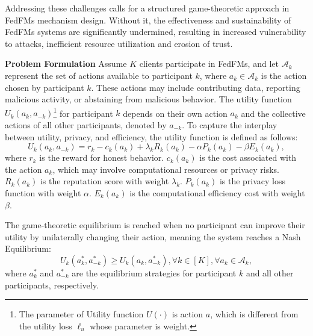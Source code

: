 Addressing these challenges calls for a structured game-theoretic approach in FedFMs mechanism design. Without it, the effectiveness and sustainability of FedFMs systems are significantly undermined, resulting in increased vulnerability to attacks, inefficient resource utilization and erosion of trust. 




\textbf{Problem Formulation} Assume $K$ clients participate in FedFMs, and let $\mathcal{A}_k$ represent the set of actions available to participant $k$, where $a_k \in \mathcal{A}_k$ is the action chosen by participant $k$. These actions may include contributing data, reporting malicious activity, or abstaining from malicious behavior. The utility function $U_k(a_k, a_{-k})$\footnote{The parameter of Utility function $U(\cdot)$ is action $a$, which is different from the utility loss $\ell_u$ whose parameter is weight.} for participant $k$ depends on their own action $a_k$ and the collective actions of all other participants, denoted by $a_{-k}$. To capture the interplay between utility, privacy, and efficiency, the utility function is defined as follows:
\begin{equation}
\label{eq:game_utility}
U_k(a_k, a_{-k}) = r_k - c_k(a_k) + \lambda_k R_k(a_k) - \alpha P_k(a_k) - \beta E_k(a_k),
\end{equation}
where $r_k$ is the reward for honest behavior. $c_k(a_k)$ is the cost associated with the action $a_k$, which may involve computational resources or privacy risks. $R_k(a_k)$ is the reputation score with weight $\lambda_k$. $P_k(a_k)$ is the privacy loss function with weight $\alpha$. $E_k(a_k)$ is the computational efficiency cost with weight $\beta$. 

The game-theoretic equilibrium is reached when no participant can improve their utility by unilaterally changing their action, meaning the system reaches a Nash Equilibrium:
\begin{equation}
\label{eq:game_nash}
U_k(a_k^*, a_{-k}^*) \geq U_k(a_k, a_{-k}^*), \forall k \in [K], \forall a_k \in \mathcal{A}_k,
\end{equation}
where $a_k^*$ and $a_{-k}^*$ are the equilibrium strategies for participant $k$ and all other participants, respectively.

